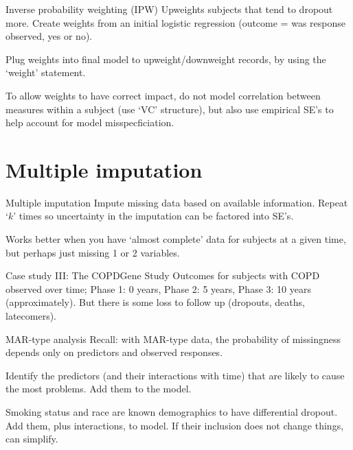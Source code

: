 \documentclass[
  9pt,
  ignorenonframetext,
]{beamer}
\begin{document}
\begin{frame}{Inverse probability weighting (IPW)}
\protect\hypertarget{inverse-probability-weighting-ipw}{}
Upweights subjects that tend to dropout more. Create weights from an
initial logistic regression (outcome = was response observed, yes or
no).

Plug weights into final model to upweight/downweight records, by using
the `weight' statement.

To allow weights to have correct impact, do not model correlation
between measures within a subject (use `VC' structure), but also use
empirical SE's to help account for model misspecficiation.
\end{frame}

\hypertarget{multiple-imputation}{%
\section{Multiple imputation}\label{multiple-imputation}}

\begin{frame}{Multiple imputation}
\protect\hypertarget{multiple-imputation-1}{}
Impute missing data based on available information. Repeat `\(k\)' times
so uncertainty in the imputation can be factored into SE's.

Works better when you have `almost complete' data for subjects at a
given time, but perhaps just missing 1 or 2 variables.

\begin{block}{Case study III: The COPDGene Study}
\protect\hypertarget{case-study-iii-the-copdgene-study}{}
Outcomes for subjects with COPD observed over time; Phase 1: 0 years,
Phase 2: 5 years, Phase 3: 10 years (approximately). But there is some
loss to follow up (dropouts, deaths, latecomers).
\end{block}
\end{frame}

\begin{frame}{MAR-type analysis}
\protect\hypertarget{mar-type-analysis}{}
Recall: with MAR-type data, the probability of missingness depends only
on predictors and observed responses.

Identify the predictors (and their interactions with time) that are
likely to cause the most problems. Add them to the model.

Smoking status and race are known demographics to have differential
dropout. Add them, plus interactions, to model. If their inclusion does
not change things, can simplify.
\end{frame}
\end{document}
